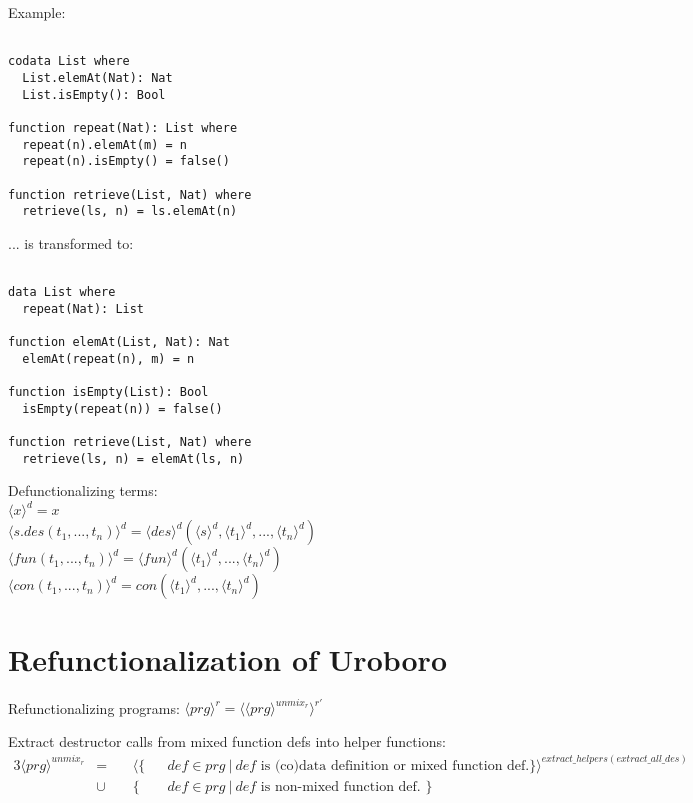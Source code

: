\documentclass[11pt]{article} %
\begin{document}
Example:

\begin{lstlisting}

codata List where
  List.elemAt(Nat): Nat
  List.isEmpty(): Bool

function repeat(Nat): List where
  repeat(n).elemAt(m) = n
  repeat(n).isEmpty() = false()

function retrieve(List, Nat) where
  retrieve(ls, n) = ls.elemAt(n)

\end{lstlisting}

... is transformed to:

\begin{lstlisting}

data List where
  repeat(Nat): List

function elemAt(List, Nat): Nat
  elemAt(repeat(n), m) = n

function isEmpty(List): Bool
  isEmpty(repeat(n)) = false()

function retrieve(List, Nat) where
  retrieve(ls, n) = elemAt(ls, n)

\end{lstlisting}

Defunctionalizing terms: \\
$\langle x \rangle^d = x$ \\
$\langle s.des(t_1, ..., t_n) \rangle^d = \langle des \rangle^d (\langle s \rangle^d, \langle t_1 \rangle^d, ..., \langle t_n \rangle^d)$ \\
$\langle fun(t_1, ..., t_n) \rangle^d = \langle fun \rangle^d (\langle t_1 \rangle^d, ..., \langle t_n \rangle^d)$ \\
$\langle con(t_1, ..., t_n) \rangle^d = con(\langle t_1 \rangle^d, ..., \langle t_n \rangle^d)$ \\

\section{Refunctionalization of Uroboro}

Refunctionalizing programs: $\langle prg \rangle^r = \langle \langle prg \rangle^{unmix_r} \rangle^{r'}$

Extract destructor calls from mixed function defs into helper functions:
\begin{alignat*}{3}
\langle prg \rangle^{unmix_r} & = ~&& \langle \{ && def \in prg ~ | ~ def \textrm{ is (co)data definition or mixed function def.} \} \rangle^{extract\_helpers(extract\_all\_des)} \\
&\cup && \{ && def \in prg ~ | ~ def \textrm{ is non-mixed function def. } \}
\end{alignat*}
\end{document}

